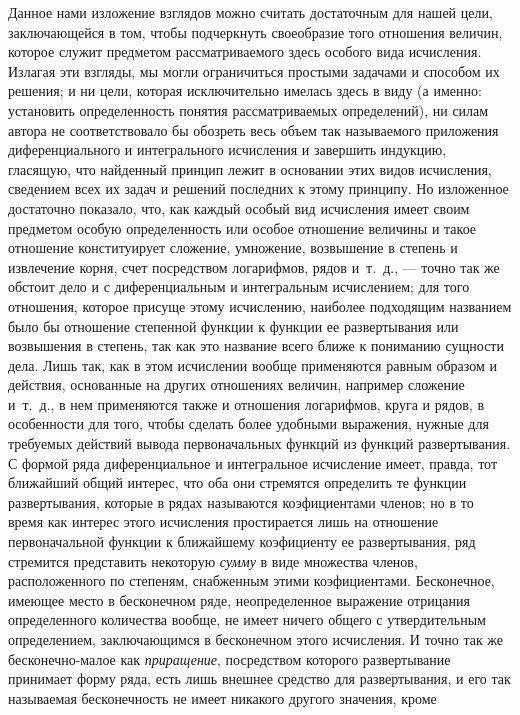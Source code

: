 {Данное нами изложение взглядов можно считать достаточным для нашей цели,
заключающейся в том, чтобы подчеркнуть своеобразие того отношения величин,
которое служит предметом рассматриваемого здесь особого вида исчисления.
Излагая эти взгляды, мы могли ограничиться простыми задачами и способом их
решения; и ни цели, которая исключительно имелась здесь в виду (а именно:
установить определенность понятия рассматриваемых определений), ни силам
автора не соответствовало бы обозреть весь объем так называемого приложения
диференциального и интегрального исчисления и завершить индукцию, гласящую,
что найденный принцип лежит в основании этих видов исчисления, сведением
всех их задач и решений последних к этому принципу. Но изложенное
достаточно показало, что, как каждый особый вид исчисления имеет своим
предметом особую определенность или особое отношение величины и такое
отношение конституирует сложение, умножение, возвышение в степень и
извлечение корня, счет посредством логарифмов, рядов и~т.~д., — точно так
же обстоит дело и с диференциальным и интегральным исчислением; для того
отношения, которое присуще этому исчислению, наиболее подходящим названием
было бы отношение степенной функции к функции ее развертывания или
возвышения в степень, так как это название всего ближе к пониманию сущности
дела. Лишь так, как в этом исчислении вообще применяются равным образом и
действия, основанные на других отношениях величин, например сложение
и~т.~д., в нем применяются также и отношения логарифмов, круга и рядов, в
особенности для того, чтобы сделать более удобными выражения, нужные для
требуемых действий вывода первоначальных функций из функций развертывания.
С формой ряда диференциальное и интегральное исчисление имеет, правда, тот
ближайший общий интерес, что оба они стремятся определить те функции
развертывания, которые в рядах называются коэфициентами членов; но в то
время как интерес этого исчисления простирается лишь на отношение
первоначальной функции к ближайшему коэфициенту ее развертывания, ряд
стремится представить некоторую {\em сумму} в виде
множества членов, расположенного по степеням, снабженным этими
коэфициентами. Бесконечное, имеющее место в бесконечном ряде,
неопределенное выражение отрицания определенного количества вообще, не
имеет ничего общего с утвердительным определением, заключающимся в
бесконечном этого исчисления. И точно так же бесконечно-малое как
{\em приращение}, посредством которого развертывание
принимает форму ряда, есть лишь внешнее средство для развертывания, и его
так называемая бесконечность не имеет никакого другого значения, кроме
}
